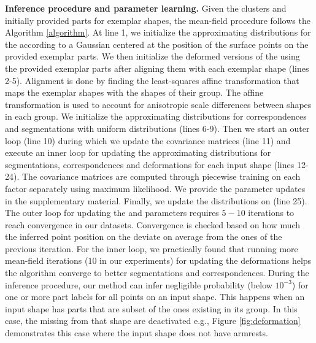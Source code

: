 \textbf{Inference procedure and parameter learning.} Given the clusters and initially provided parts for exemplar shapes, the mean-field procedure follows the Algorithm \ref{algorithm}. At line 1, we initialize the approximating distributions for the  according to a Gaussian centered at the position of the surface points on the provided exemplar parts. We then initialize the deformed versions of the  using the provided exemplar parts after aligning them with each exemplar shape (lines 2-5). Alignment is done by finding the least-squares affine transformation that maps the exemplar shapes with the shapes of their group. The affine transformation is used to account for anisotropic scale differences between shapes in each group. We initialize the approximating distributions for correspondences and segmentations with uniform distributions (lines 6-9). Then we start an outer loop (line 10) during which we update the covariance matrices (line 11) and execute an inner loop for updating the approximating distributions for segmentations, correspondences and deformations for each input shape (lines 12-24). The covariance matrices are computed through piecewise training \cite{Sutton05} on each factor separately using maximum likelihood. We provide the parameter updates in the supplementary material. Finally, we update the distributions on  (line 25). The outer loop for updating the  and parameters requires $5-10$ iterations to reach convergence in our datasets. Convergence is checked based on how much the inferred point position on the  deviate on average from the ones of the previous iteration.  For the inner loop, we practically found that running more mean-field iterations ($10$ in our experiments) for updating the deformations helps the algorithm converge to better segmentations and correspondences. During the inference procedure, our method can infer negligible probability (below $10^{-3}$) for one or more part labels for all points on an input shape. This happens when an input shape has parts that are subset of the ones existing in its group. In this case, the  missing from that shape are deactivated e.g., Figure \ref{fig:deformation} demonstrates this case where the input shape does not have armrests. 

